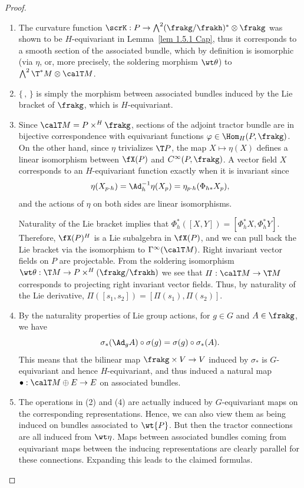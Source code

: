 \begin{proof}
    \begin{enumerate}[label=(\arabic*)]
        \item The curvature function $\scrK:P\to \bigwedge\nolimits^2(\frakg\slash\frakh)^\ast\otimes\frakg$ was shown to be $H$-equivariant in Lemma~\ref{lem 1.5.1 Cap}, thus it corresponds to a smooth section of the associated bundle, which by definition is isomorphic (via $\eta$, or, more precisely, the soldering morphism $\wt\theta$) to $\bigwedge\nolimits^2\T^\ast M\otimes\calT M$.
        \item $\{\,,\,\}$ is simply the morphism between associated bundles induced by the Lie bracket of $\frakg$, which is $H$-equivariant.
        \item Since $\calT M=P\times^H\frakg$, sections of the adjoint tractor bundle are in bijective correspondence with equivariant functions $\varphi\in\Hom_H(P,\frakg)$. On the other hand, since $\eta$ trivializes $\T P$, the map $X\mapsto \eta(X)$ defines a linear isomorphism between $\fX(P)$ and $C^\infty(P,\frakg)$. A vector field $X$ corresponds to an $H$-equivariant function exactly when it is invariant since
        \[\eta(X_{p\cdot h})=\Ad_h^{-1}\eta(X_p)=\eta_{p\cdot h}(\Phi_{h\ast}X_p),\]
        and the actions of $\eta$ on both sides are linear isomorphisms.

        Naturality of the Lie bracket implies that $\Phi_h^\ast([X,Y])=[\Phi_h^\ast X,\Phi_h^\ast Y]$. Therefore, $\fX(P)^H$ is a Lie subalgebra in $\fX(P)$, and we can pull back the Lie bracket via the isomorphism to $\Gamma^\infty(\calT M)$. Right invariant vector fields on $P$ are projectable. From the soldering isomorphism $\wt\theta:\T M\to P\times^H (\frakg\slash\frakh)$ we see that $\varPi:\calT M\to \T M$ corresponds to projecting right invariant vector fields. Thus, by naturality of the Lie derivative, $\varPi([s_1,s_2])=[\varPi(s_1),\varPi(s_2)]$.
        \item By the naturality properties of Lie group actions, for $g\in G$ and $A\in\frakg$, we have
        \[\sigma_\ast(\Ad_g A)\circ \sigma(g)=\sigma(g)\circ \sigma_\ast(A).\]
        This means that the bilinear map $\frakg\times V\to V$ induced by $\sigma_\ast$ is $G$-equivariant and hence $H$-equivariant, and thus induced a natural map $\bullet:\calT M\oplus E\to E$ on associated bundles.
        \item The operations in (2) and (4) are actually induced by $G$-equivariant maps on the corresponding representations. Hence, we can also view them as being induced on bundles associated to $\wt{P}$. But then the tractor connections are all induced from $\wt\eta$. Maps between associated bundles coming from equivariant maps between the inducing representations are clearly parallel for these connections. Expanding this leads to the claimed formulas.
    \end{enumerate}
\end{proof}


